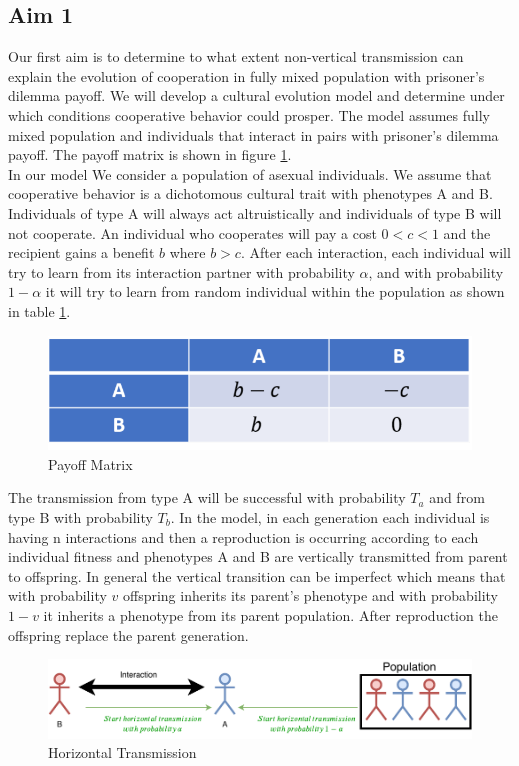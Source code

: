 \documentclass{article}
\begin{document}
\subsection*{Aim 1} Our first aim is to determine to what extent non-vertical transmission can explain the evolution of cooperation in fully mixed population with prisoner's dilemma payoff.
We will develop a cultural evolution model and determine under which conditions cooperative behavior could prosper. The model assumes fully mixed population and individuals that interact in pairs with prisoner's dilemma payoff. The payoff matrix is shown in figure \ref{fig:payoff}. 
\\In our model We consider a population of asexual individuals. We assume that cooperative behavior is a dichotomous cultural trait with phenotypes A and B.  Individuals of type A will always act altruistically and individuals of type B will not cooperate. An individual who cooperates will pay a cost $0<c<1$ and the recipient gains a benefit $b$ where $b>c$.
After each interaction, each individual will try to learn from its interaction partner with probability $\alpha$, and with probability $1-\alpha$ it will try to learn from random individual within the population as shown in table \ref{fig:payoff}. 
\begin{figure}[h!]
  \centering
  \includegraphics[scale=0.5]{payoff.pdf}
  \caption{Payoff Matrix}
  \label{fig:payoff}
\end{figure}

The transmission from type A will be successful with probability $T_a$ and from type B with probability $T_b$.
In the model, in each generation each individual is having n interactions and then a reproduction is occurring according to each individual fitness and phenotypes A and B are vertically transmitted from parent to offspring. In general the vertical transition can be imperfect which means that with probability $v$ offspring inherits its parent’s phenotype and with probability $1-v$ it inherits a phenotype from its parent population. After reproduction the offspring replace the parent generation.
\begin{figure}[h!]
  \centering
  \includegraphics[scale=1]{figure.pdf}
  \caption{Horizontal Transmission}
  \label{fig:figure}
\end{figure}
\end{document}
